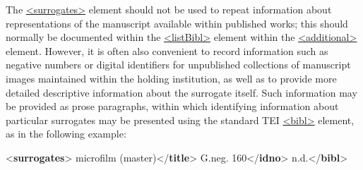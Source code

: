The \hyperref[TEI.surrogates]{<surrogates>} element should not be used to repeat information about representations of the manuscript available within published works; this should normally be documented within the \hyperref[TEI.listBibl]{<listBibl>} element within the \hyperref[TEI.additional]{<additional>} element. However, it is often also convenient to record information such as negative numbers or digital identifiers for unpublished collections of manuscript images maintained within the holding institution, as well as to provide more detailed descriptive information about the surrogate itself. Such information may be provided as prose paragraphs, within which identifying information about particular surrogates may be presented using the standard TEI \hyperref[TEI.bibl]{<bibl>} element, as in the following example: \par\bgroup{}\exampleFont \begin{shaded}\noindent\mbox{}{<\textbf{surrogates}>}\mbox{}\newline 
{}\mbox{}\newline 
\hspace*{1em}microfilm (master){</\textbf{title}>}\mbox{}\newline 
\hspace*{1em}G.neg. 160{</\textbf{idno}>}\mbox{}\newline 
\hspace*{1em}\hspace*{1em} n.d.{</\textbf{bibl}>}\mbox{}\newline 

\end{shaded}
